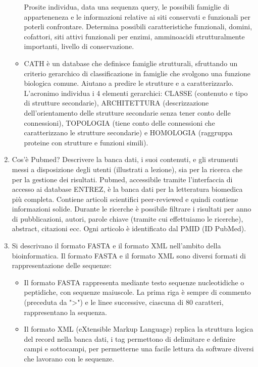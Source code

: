 \documentclass{article}
\begin{document}
\begin{enumerate}
\begin{itemize}
               \subitem Prosite individua, data una sequenza query, le possibili famiglie di apparteneneza e le informazioni relative ai siti conservati e funzionali per poterli confrontare.  Determina possibili caratteristiche funzionali, domini, cofattori, siti attivi funzionali per enzimi, amminoacidi strutturalmente importanti, livello di conservazione.
            \item CATH è un database che definisce famiglie strutturali, sfruttando un criterio gerarchico di classificazione in famiglie che svolgono una funzione biologica comune. Aiutano a predire le strutture e a caratterizzarlo. L'acronimo individua i 4 elementi gerarchici: CLASSE (contenuto e tipo di strutture secondarie), ARCHITETTURA (descrizzazione dell'orientamento delle strutture secondarie senza tener conto delle connessioni), TOPOLOGIA (tiene conto delle connessioni che caratterizzano le strutture secondarie) e HOMOLOGIA (raggruppa proteine con strutture e funzioni simili).
         \end{itemize}
    \item Cos'è Pubmed? Descrivere la banca dati, i suoi contenuti, e gli strumenti messi a disposizione degli utenti (illustrati a lezione), sia per la ricerca che per la gestione dei risultati.
      \subitem{-} Pubmed, accessibile tramite l'interfaccia di accesso ai database ENTREZ, è la banca dati per la letteratura biomedica più completa. Contiene articoli scientifici peer-reviewed e quindi contiene informazioni solide. Durante le ricerche è possibile filtrare i risultati per anno di pubblicazioni, autori, parole chiave (tramite cui effettuiamo le ricerche), abstract, citazioni ecc. Ogni articolo è identificato dal PMID (ID PubMed).
    \item Si descrivano il formato FASTA e il formato XML nell'ambito della bioinformatica.
      \subitem Il formato FASTA e il formato XML sono diversi formati di rappresentazione delle sequenze:
         \begin{itemize}
            \item Il formato FASTA rappresenta mediante testo sequenze nucleotidiche o peptidiche, con sequenze maiuscole. La prima riga è sempre di commento (preceduta da ">") e le linee successive, ciascuna di 80 caratteri, rappresentano la sequenza.
            \item Il formato XML (eXtensible Markup Language) replica la struttura logica del record nella banca dati, i tag permettono di delimitare e definire campi e sottocampi, per permetterne una facile lettura da software diversi che lavorano con le sequenze.
         \end{itemize}
\end{enumerate}
\end{document}
